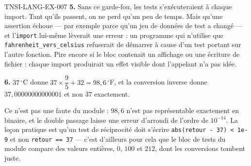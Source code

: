 \begin{corrige}{TNSI-LANG-EX-007}
\textbf{5.} Sans ce garde-fou, les tests s'exécuteraient à chaque import. Tant
qu'ils passent, on ne perd qu'un peu de temps. Mais qu'une assertion échoue — par
exemple parce qu'un jeu de données de test a changé — et l'\lstinline{import}
lui-même lèverait une erreur : un programme qui n'utilise que
\lstinline{fahrenheit_vers_celsius} refuserait de démarrer à cause d'un test
portant sur l'autre fonction. Pire encore si le bloc contenait un affichage ou
une écriture de fichier : chaque import produirait un effet visible dont
l'appelant n'a pas idée.

\textbf{6.} $37\,^\circ$C donne $37\times\dfrac95+32=98{,}6\,^\circ$F, et la
conversion inverse donne $37{,}00000000000001$ et non $37$ exactement.

Ce n'est pas une faute du module : $98{,}6$ n'est pas représentable exactement en
binaire, et le double passage laisse une erreur d'arrondi de l'ordre de
$10^{-14}$. La leçon pratique est qu'un test de réciprocité doit s'écrire
\lstinline{abs(retour - 37) < 1e-9} et non \lstinline{retour == 37} — c'est
d'ailleurs pour cela que le bloc de tests du module compare des valeurs entières,
$0$, $100$ et $212$, dont les conversions tombent juste.
\end{corrige}
